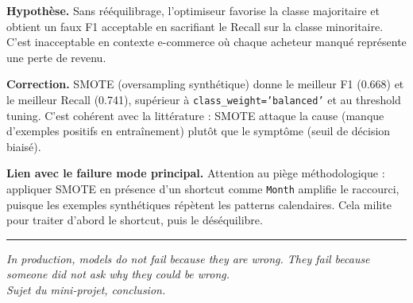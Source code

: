 \documentclass[11pt,a4paper]{article}
\newcommand{\code}[1]{\texttt{\small#1}}
\begin{document}
\textbf{Hypothèse.} Sans rééquilibrage, l'optimiseur favorise la classe majoritaire et obtient un faux F1 acceptable en sacrifiant le Recall sur la classe minoritaire. C'est inacceptable en contexte e-commerce où chaque acheteur manqué représente une perte de revenu.

\textbf{Correction.} SMOTE (oversampling synthétique) donne le meilleur F1 (0.668) et le meilleur Recall (0.741), supérieur à \code{class\_weight='balanced'} et au threshold tuning. C'est cohérent avec la littérature : SMOTE attaque la cause (manque d'exemples positifs en entraînement) plutôt que le symptôme (seuil de décision biaisé).

\textbf{Lien avec le failure mode principal.} Attention au piège méthodologique : appliquer SMOTE en présence d'un shortcut comme \code{Month} amplifie le raccourci, puisque les exemples synthétiques répètent les patterns calendaires. Cela milite pour traiter d'abord le shortcut, puis le déséquilibre.

\vspace{1cm}
\begin{center}
{\color{accent}\rule{0.4\textwidth}{0.5pt}}
\end{center}

\begin{quotebox}
\itshape\small \og In production, models do not fail because they are wrong. They fail because someone did not ask why they could be wrong. \fg{}\\[0.2cm]
\normalfont\small Sujet du mini-projet, conclusion.
\end{quotebox}
\end{document}
